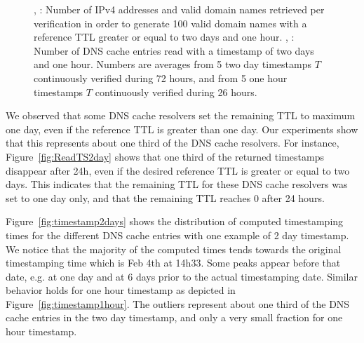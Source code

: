 \begin{figure*}
\begin{center}
\caption{, :  Number of IPv4 addresses and valid domain names retrieved per verification in order to generate 100 valid domain names with a reference TTL greater or equal to  two days and  one hour. , :  Number of DNS cache entries read with a timestamp of  two days and  one hour. Numbers are averages from 5 two day timestamps $T$ continuously verified during 72 hours, and from 5 one hour timestamps $T$ continuously verified during 26 hours.}
\end{center}
\end{figure*}

We observed that some DNS cache resolvers set the remaining TTL to maximum one day, even if the reference TTL is greater than one day. Our experiments show that this represents about one third of the DNS cache resolvers. For instance, Figure~\ref{fig:ReadTS2day} shows that one third of the returned timestamps disappear after 24h, even if the desired reference TTL is greater or equal to two days. This indicates that the remaining TTL for these DNS cache resolvers was set to one day only, and that the remaining TTL reaches $0$ after 24 hours.

Figure~\ref{fig:timestamp2days} shows the distribution of computed timestamping times for the different DNS cache entries with one example of 2 day timestamp. We notice that the majority of the computed times tends towards the original timestamping time which is Feb 4th at 14h33. Some peaks appear before that date, e.g. at one day and at 6 days prior to the actual timestamping date. Similar behavior holds for one hour timestamp as depicted in Figure~\ref{fig:timestamp1hour}. The outliers represent about one third of the DNS cache entries in the two day timestamp, and only a very small fraction for one hour timestamp.

